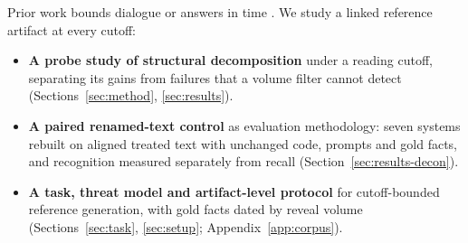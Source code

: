 Prior work bounds dialogue or answers in time \citep{ahn2024timechara,huang2025living}.
We study a linked reference artifact at every cutoff:
\begin{itemize}[leftmargin=*,itemsep=0pt,topsep=2pt]
  \item \textbf{A probe study of structural decomposition} under a reading cutoff,
    separating its gains from failures that a volume filter cannot detect
    (Sections~\ref{sec:method}, \ref{sec:results}).
  \item \textbf{A paired renamed-text control} as evaluation methodology: seven systems
    rebuilt on aligned treated text with unchanged code, prompts and gold facts, and
    recognition measured separately from recall (Section~\ref{sec:results-decon}).
  \item \textbf{A task, threat model and artifact-level protocol} for cutoff-bounded
    reference generation, with  gold facts dated by reveal volume
    (Sections~\ref{sec:task}, \ref{sec:setup}; Appendix~\ref{app:corpus}).
\end{itemize}
